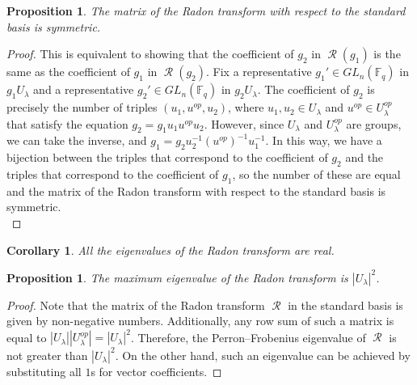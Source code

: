 \documentclass[12pt,reqno]{amsart}
\newtheorem{cor}[thm]{Corollary}
\newtheorem{prop}[thm]{Proposition}
\theoremstyle{definition}
\theoremstyle{remark}
\numberwithin{equation}{section}
\newcommand{\GL}[1]{GL_{#1}(\mathbb{F}_q)}
\DeclareMathOperator{\R}{\mathcal{R}}
\begin{document}
\begin{prop}\label{symmetric_Rd}
    The matrix of the Radon transform with respect to the standard basis is symmetric.
\end{prop}
\begin{proof}
    This is equivalent to showing that the coefficient of $g_2$ in $\R (g_1)$ is the same as the coefficient of $g_1$ in $\R (g_2)$. Fix a representative $g_1' \in \GL{n}$ in $g_1 U_\lambda$ and a representative $g_2' \in \GL{n}$ in $g_2 U_\lambda$. The coefficient of $g_2$ is precisely the number of triples $(u_1, u^{op}, u_2)$, where $u_1, u_2 \in U_\lambda$ and $u^{op} \in U_\lambda^{op}$ that satisfy the equation $g_2 = g_1 u_1 u^{op} u_2$. However, since $U_\lambda$ and $U_\lambda^{op}$ are groups, we can take the inverse, and $g_1 = g_2 u_2^{-1} (u^{op})^{-1}u_1^{-1}$. In this way, we have a bijection between the triples that correspond to the coefficient of $g_2$ and the triples that correspond to the coefficient of $g_1$, so the number of these are equal and the matrix of the Radon transform with respect to the standard basis is symmetric.\\
\end{proof}


\begin{cor}
    All the eigenvalues of the Radon transform are real.\\
\end{cor} 

\begin{prop}
    The maximum eigenvalue of the Radon transform is $|U_\lambda|^2$.\\
\end{prop}
\begin{proof}
    Note that the matrix of the Radon transform $\R$ in the standard basis is given by non-negative numbers. Additionally, any row sum of such a matrix is equal to $|U_{\lambda}||U_{\lambda}^{op}|=|U_{\lambda}|^2$. Therefore, the Perron–Frobenius eigenvalue of $\R$ is not greater than $|U_{\lambda}|^2$. On the other hand, such an eigenvalue can be achieved by substituting all $1$s for vector coefficients.
\end{proof} 
\end{document}
